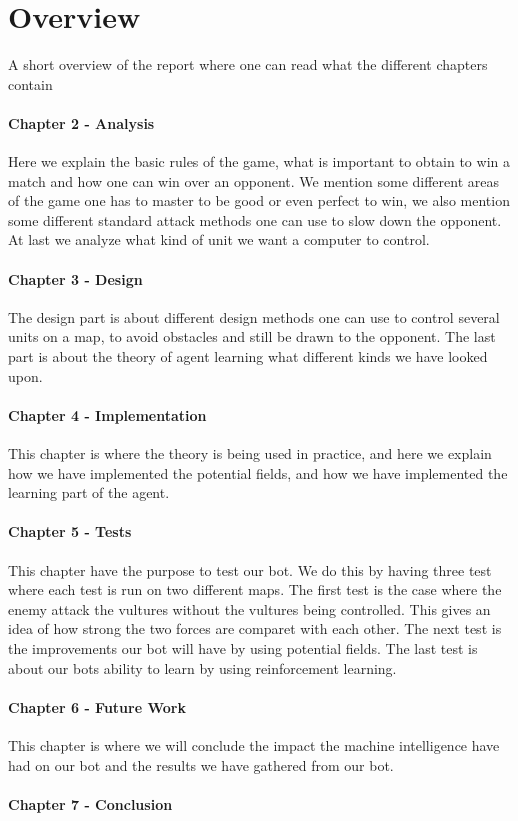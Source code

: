 \section{Overview}
	A short overview of the report where one can read what the different chapters contain

\paragraph*{Chapter 2 - Analysis}
Here we explain the basic rules of the game, what is important to obtain to win a match and how one can win over an opponent. We mention some different areas of the game one has to master to be good or even perfect to win, we also mention some different standard attack methods one can use to slow down the opponent. At last we analyze what kind of unit we want a computer to control.
\paragraph*{Chapter 3 - Design}
The design part is about different design methods one can use to control several units on a map, to avoid obstacles and still be drawn to the opponent. The last part is about the theory of agent learning what different kinds we have looked upon.
\paragraph*{Chapter 4 - Implementation}
This chapter is where the theory is being used in practice, and here we explain how we have implemented the potential fields, and how we have implemented the learning part of the agent.
\paragraph*{Chapter 5 - Tests}
This chapter have the purpose to test our bot. We do this by having three test where each test is run on two different maps. The first test is the case
where the enemy attack the vultures without the vultures being controlled. This gives an idea of how strong the two forces are comparet with each other. The next test is the improvements our bot will have by using potential fields. The last test is about our bots ability to learn by using reinforcement learning.
\paragraph*{Chapter 6 - Future Work}
This chapter is where we will conclude the impact the machine intelligence have had on our bot and the results we have gathered from our bot.
\paragraph*{Chapter 7 - Conclusion}
